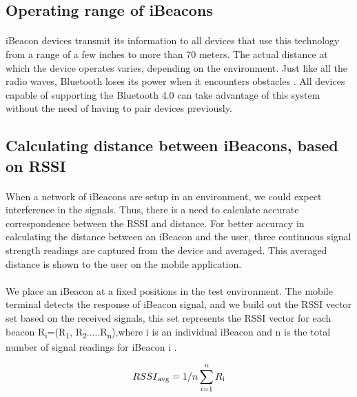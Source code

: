 \documentclass[12pt]{article}
\begin{document}
\subsection{Operating range of iBeacons}
\paragraph{}iBeacon devices transmit its information to all devices that use this technology from a range of a few inches to more than 70 meters. The actual distance at which the device operates varies, depending on the environment. Just like all the radio waves, Bluetooth loses its power when it encounters obstacles \cite{demo}. All devices capable of supporting the Bluetooth 4.0 can take advantage of this system without the need of having to pair devices previously.

\subsection{Calculating distance between iBeacons, based on RSSI}
\paragraph{}When a network of iBeacons are setup in an environment, we could expect interference in the signals. Thus, there is a need to calculate accurate correspondence between the RSSI and distance. For better accuracy in calculating the distance between an iBeacon and the user, three continuous signal strength readings are captured from the device and averaged. This averaged distance is shown to the user on the mobile application.

\paragraph{}We place an iBeacon at a fixed positions in the test environment. The mobile terminal detects the response of iBeacon signal, and we build out the RSSI vector set based on the received signals, this set represents the RSSI vector for each beacon R\textsubscript{i}=(R\textsubscript{1}, R\textsubscript{2}.....R\textsubscript{n}),where i is an individual iBeacon and n is the total number of signal readings for iBeacon i \cite{distanceTrack}.

\begin{equation}
RSSI\textsubscript{avg} = 1/n \sum_{i=1}^n R \textsubscript{i}
\end{equation}
\end{document}
